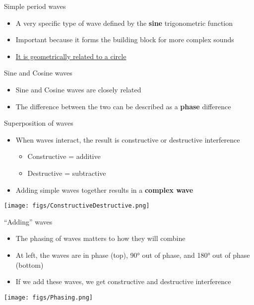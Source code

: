 \documentclass[professionalfonts]{beamer}
\begin{document}
\begin{frame}{Simple period waves}
    \begin{itemize}
        \item A very specific type of wave defined by the \textbf{sine} trigonometric function
        \item Important because it forms the building block for more complex sounds
        \item \href{https://www.acs.psu.edu/drussell/Demos/complex/complex.html}{It is geometrically related to a circle}
    \end{itemize}
\end{frame}

\begin{frame}{Sine and Cosine waves}
    \begin{itemize}
        \item Sine and Cosine waves are closely related
        \item The difference between the two can be described as a \textbf{phase} difference
    \end{itemize}
\end{frame}

\begin{frame}{Superposition of waves}
    \begin{multicols}{2}
        \begin{itemize}
        \item When waves interact, the result is constructive or destructive interference
        \begin{itemize}
            \item Constructive = additive 
            \item Destructive = subtractive
        \end{itemize}
    \item Adding simple waves together results in a \textbf{complex wave}
    \end{itemize}

    \columnbreak

    \texttt{[image: figs/ConstructiveDestructive.png]}
    \end{multicols}
\end{frame}

\begin{frame}{“Adding” waves}
    \begin{multicols}{2}
        \begin{itemize}
            \item The phasing of waves matters to how they will combine
            \item At left, the waves are in phase (top), 90° out of phase, and 180° out of phase (bottom)
            \item If we add these waves, we get constructive and destructive interference
        \end{itemize}

        \columnbreak

        \texttt{[image: figs/Phasing.png]}
    \end{multicols}
\end{frame}
\end{document}
